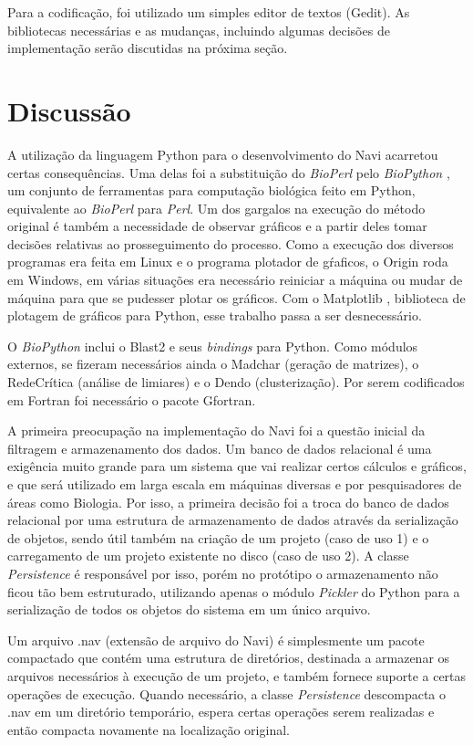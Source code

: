 Para a codificação, foi utilizado um simples editor de textos (Gedit). As bibliotecas necessárias e as mudanças, incluindo algumas decisões de implementação
serão discutidas na próxima seção.

\section{Discussão} \label{sec:discussao}

A utilização da linguagem Python para o desenvolvimento do Navi acarretou certas consequências. Uma delas foi a substituição do \textit{BioPerl} pelo
\textit{BioPython} \cite{biopython}, um conjunto de ferramentas para computação biológica feito em Python, equivalente ao \textit{BioPerl} para \textit{Perl}.
Um dos gargalos na execução do método original é também a necessidade de observar gráficos e a partir deles tomar decisões relativas ao prosseguimento do
processo. Como a execução dos diversos programas era feita em Linux e o programa plotador de gŕaficos, o Origin \cite{origin} roda em Windows, em várias
situações era necessário reiniciar a máquina ou mudar de máquina para que se pudesser plotar os gráficos. Com o Matplotlib \cite{matplotlib}, biblioteca de 
plotagem de gráficos para Python, esse trabalho passa a ser desnecessário.

O \textit{BioPython} inclui o Blast2 e seus \textit{bindings} para Python. Como módulos externos, se fizeram necessários ainda o Madchar (geração de matrizes),
o RedeCrítica (análise de limiares) e o Dendo (clusterização). Por serem codificados em Fortran foi necessário o pacote Gfortran.

A primeira preocupação na implementação do Navi foi a questão inicial da filtragem e armazenamento dos dados. Um banco de dados relacional é uma exigência
muito grande para um sistema que vai realizar certos cálculos e gráficos, e que será utilizado em larga escala em máquinas diversas e por pesquisadores de
áreas como Biologia. Por isso, a primeira decisão foi a troca do banco de dados relacional por uma estrutura de armazenamento de dados através da serialização
de objetos, sendo útil também na criação de um projeto (caso de uso 1) e o carregamento de um projeto existente no disco (caso de uso 2). A classe 
\textit{Persistence} é responsável por isso, porém no protótipo o armazenamento não ficou tão bem estruturado, utilizando apenas o módulo \textit{Pickler}
do Python para a serialização de todos os objetos do sistema em um único arquivo.

Um arquivo .nav (extensão de arquivo do Navi) é simplesmente um pacote compactado que contém uma estrutura de diretórios, destinada a armazenar os arquivos
necessários à execução de um projeto, e também fornece suporte a certas operações de execução. Quando necessário, a classe \textit{Persistence} descompacta
o .nav em um diretório temporário, espera certas operações serem realizadas e então compacta novamente na localização original.

